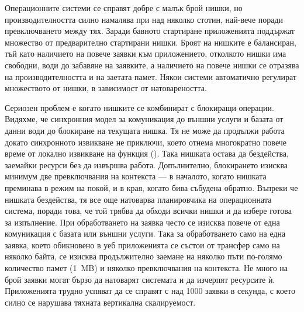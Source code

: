 Операционните системи се справят добре с малък брой нишки, но производителността силно намалява при над няколко стотин, най-вече поради превключването между тях. Заради бавното стартиране приложенията поддържат множество от предварително стартирани нишки. Броят на нишките е балансиран, тъй като наличието на повече заявки към приложението, отколкото нишки има свободни, води до забавяне на заявките, а наличието на повече нишки се отразява на производителността и на заетата памет. Някои системи автоматично регулират множеството от нишки, в зависимост от натовареността.

Сериозен проблем е когато нишките се комбинират с блокиращи операции. Видяхме, че синхронния модел за комуникация до външни услуги и базата от данни води до блокиране на текущата нишка. Тя не може да продължи работа докато синхронното извикване не приключи, което отнема многократно повече време от локално извикване на функция (). Така нишката остава да бездейства, заемайки ресурси без да извършва работа. Допълнително, блокирането изисква минимум две превключвания на контекста — в началото, когато нишката преминава в режим на покой, и в края, когато бива събудена обратно. Въпреки че нишката бездейства, тя все още натоварва планировчика на операционната система, поради това, че той трябва да обходи всички нишки и да избере готова за изпълнение. При обработването на заявка често се изисква повече от една комуникация с базата или външни услуги. Така за обработването само на една заявка, което обикновено в уеб приложенията се състои от трансфер само на няколко байта, се изисква продължително заемане на няколко пъти по-голямо количество памет (1~MB) и няколко превключвания на контекста. Не много на брой заявки могат бързо да натоварят системата и да изчерпят ресурсите ѝ. Приложенията трудно успяват да се справят с над 1000 заявки в секунда, с което силно се нарушава тяхната вертикална скалируемост.

